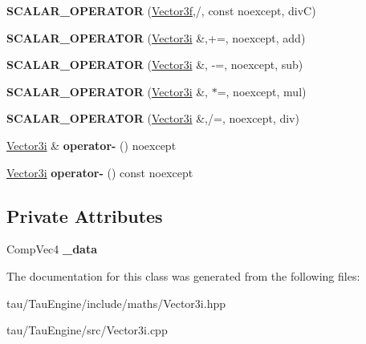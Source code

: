 \begin{DoxyCompactItemize}
\item 
\mbox{\label{class_vector3i_ac4b0ae595a00ed6f82e5095b5496a21a}} 
{\bfseries S\+C\+A\+L\+A\+R\+\_\+\+O\+P\+E\+R\+A\+T\+OR} (\mbox{\hyperlink{class_vector3f}{Vector3f}},/, const noexcept, divC)
\item 
\mbox{\label{class_vector3i_a5e8bc0b08244f05bce40c5dffdb3c78b}} 
{\bfseries S\+C\+A\+L\+A\+R\+\_\+\+O\+P\+E\+R\+A\+T\+OR} (\mbox{\hyperlink{class_vector3i}{Vector3i}} \&,+=, noexcept, add)
\item 
\mbox{\label{class_vector3i_af8a994e0f92439b4dbc20d6adf141d9f}} 
{\bfseries S\+C\+A\+L\+A\+R\+\_\+\+O\+P\+E\+R\+A\+T\+OR} (\mbox{\hyperlink{class_vector3i}{Vector3i}} \&, -\/=, noexcept, sub)
\item 
\mbox{\label{class_vector3i_a970f8ce9afcba9d4861ce490ca88a386}} 
{\bfseries S\+C\+A\+L\+A\+R\+\_\+\+O\+P\+E\+R\+A\+T\+OR} (\mbox{\hyperlink{class_vector3i}{Vector3i}} \&, $\ast$=, noexcept, mul)
\item 
\mbox{\label{class_vector3i_a3b797607d833c06468ceeea6f958172c}} 
{\bfseries S\+C\+A\+L\+A\+R\+\_\+\+O\+P\+E\+R\+A\+T\+OR} (\mbox{\hyperlink{class_vector3i}{Vector3i}} \&,/=, noexcept, div)
\item 
\mbox{\label{class_vector3i_abd2ccf50e17e17156d0c1e8948293d06}} 
\mbox{\hyperlink{class_vector3i}{Vector3i}} \& {\bfseries operator-\/} () noexcept
\item 
\mbox{\label{class_vector3i_a15059f4ccba193e142089d60f09330c8}} 
\mbox{\hyperlink{class_vector3i}{Vector3i}} {\bfseries operator-\/} () const noexcept
\end{DoxyCompactItemize}
\subsection*{Private Attributes}
\begin{DoxyCompactItemize}
\item 
\mbox{\label{class_vector3i_a5b1f79d191c08fab0e4e62a5fa21cc19}} 
Comp\+Vec4 {\bfseries \+\_\+data}
\end{DoxyCompactItemize}


The documentation for this class was generated from the following files\+:\begin{DoxyCompactItemize}
\item 
tau/\+Tau\+Engine/include/maths/Vector3i.\+hpp\item 
tau/\+Tau\+Engine/src/Vector3i.\+cpp\end{DoxyCompactItemize}
